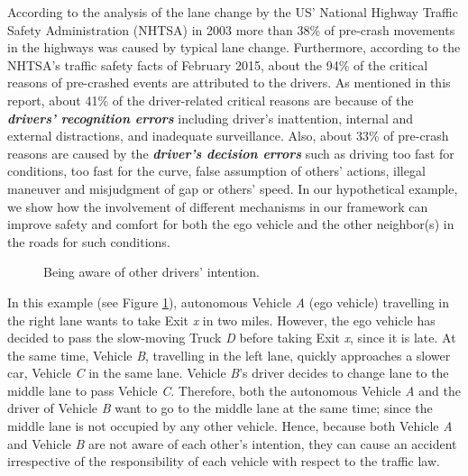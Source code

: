 \documentclass[journal, 11pt]{IEEEtran}
\begin{document}
According to the analysis of the lane change by the US' National Highway Traffic
Safety Administration (NHTSA) in 2003 more than 38\% of pre-crash movements in
the highways was caused by typical lane change. Furthermore, according to the
NHTSA's traffic safety facts of February 2015, about the 94\% of the critical
reasons of pre-crashed events are attributed to the drivers. As mentioned in
this report, about 41\% of the driver-related critical reasons are because of
the \textit{\textbf{drivers' recognition errors}} including driver’s
inattention, internal and external distractions, and inadequate surveillance.
Also, about 33\% of pre-crash reasons are caused by the \textit{\textbf{driver's
decision errors}} such as driving too fast for conditions, too fast for the
curve, false assumption of others’ actions, illegal maneuver and misjudgment of
gap or others’ speed. In our hypothetical example, we show how the involvement
of different mechanisms in our framework can improve safety and comfort for both
the ego vehicle and the other neighbor(s) in the roads for such conditions.

\begin{figure}[!t]
  \centerline{}
  \vspace*{-2mm}
  \caption{Being aware of other drivers' intention.}
  \label{fig:example1}
  \vspace*{-5mm}
\end{figure}

In this example (see Figure \ref{fig:example1}), autonomous Vehicle
\textit{A} (ego vehicle) travelling in the right lane wants to take Exit
\textit{x} in two miles. However, the ego vehicle has decided to pass the
slow-moving Truck \textit{D} before taking Exit \textit{x}, since it is late. At
the same time, Vehicle \textit{B}, travelling in the left lane, quickly
approaches a slower car, Vehicle \textit{C} in the same lane. Vehicle
\textit{B}'s driver decides to change lane to the middle lane to pass Vehicle
\textit{C}. Therefore, both the autonomous Vehicle \textit{A} and the driver of
Vehicle \textit{B} want to go to the middle lane at the same time; since the
middle lane is not occupied by any other vehicle. Hence, because both Vehicle
\textit{A} and Vehicle \textit{B} are not aware of each other's intention, they
can cause an accident irrespective of the responsibility of each vehicle with
respect to the traffic law.
\end{document}

